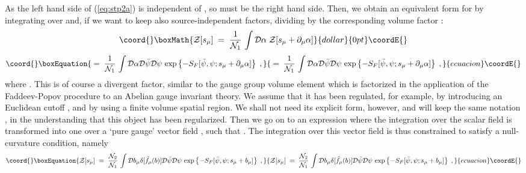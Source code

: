 \documentclass[a4paper,12pt]{article}
\begin{document}
As the left hand side of (\ref{eq:stp2a}) is independent of \myHighlight{$\alpha$}\coordHE{},
so must be the right hand side. Then, we obtain an equivalent form for
\coordHE{} by integrating over \myHighlight{$\alpha$}\coordHE{} and, if we want to
keep also source-independent factors, dividing by the corresponding
volume factor \coordHE{}:
$$\coord{}\boxMath{
{\mathcal Z}[s_\mu] \;=\;\frac{1}{{\mathcal N}_1}\, \int {\mathcal
  D}\alpha \; {\mathcal Z}[s_\mu + \partial_\mu\alpha]
}{dollar}{0pt}\coordE{}$$
 \begin{equation}\coord{}\boxEquation{
  \label{eq:stp3}
  \;=\;\frac{1}{{\mathcal N}_1}\, \int {\mathcal
    D}\alpha  {\mathcal D}{\bar\psi} {\mathcal D}\psi \,
    \exp \left\{- S_F[{\bar\psi},\psi; s_\mu + \partial_\mu \alpha] \right\} \;,
}{
  \;=\;\frac{1}{{\mathcal N}_1}\, \int {\mathcal
    D}\alpha  {\mathcal D}{\bar\psi} {\mathcal D}\psi \,
    \exp \left\{- S_F[{\bar\psi},\psi; s_\mu + \partial_\mu \alpha] \right\} \;,
}{ecuacion}\coordE{}\end{equation}
where \coordHE{}. This is of course a divergent
factor, similar to the gauge group volume element which is factorized
in the application of the Faddeev-Popov procedure to an Abelian gauge
invariant theory. We assume that it has been regulated, for example,
by introducing an Euclidean cutoff \myHighlight{$\Lambda$}\coordHE{}, and by using a finite volume
spatial region. We shall not need its explicit form, however, and will
keep the same notation \coordHE{}, in the understanding that
this object has been regularized.  Then we go on to an expression
where the integration over the scalar field \myHighlight{$\alpha$}\coordHE{} is transformed into
one over a `pure gauge' vector field \coordHE{}, such that \coordHE{}.
The integration over this vector field is thus constrained to satisfy
a null-curvature condition, namely
\begin{equation}\coord{}\boxEquation{
  \label{eq:nullc}
  {\mathcal Z}[s_\mu] \;=\;\frac{{\mathcal N}_2}{{\mathcal N}_1}\, \int {\mathcal
    D}b_\mu  \delta[{\tilde f}_\mu(b)]{\mathcal D}{\bar\psi} {\mathcal D}\psi \,
    \exp \left\{- S_F[{\bar\psi},\psi; s_\mu + b_\mu] \right\} \;,
}{
  {\mathcal Z}[s_\mu] \;=\;\frac{{\mathcal N}_2}{{\mathcal N}_1}\, \int {\mathcal
    D}b_\mu  \delta[{\tilde f}_\mu(b)]{\mathcal D}{\bar\psi} {\mathcal D}\psi \,
    \exp \left\{- S_F[{\bar\psi},\psi; s_\mu + b_\mu] \right\} \;,
}{ecuacion}\coordE{}\end{equation}
\end{document}
